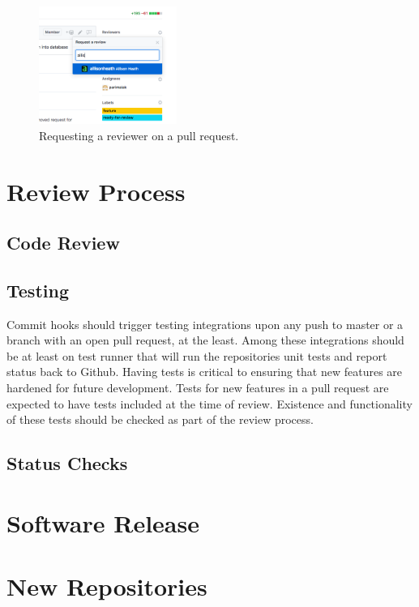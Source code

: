\documentclass[a4paper,12pt,titlepage]{scrartcl}
\begin{document}
   	\begin{figure}
  		\centering
    		\includegraphics[width=0.4\textwidth]{images/requestreviewer.png}
    		\caption{Requesting a reviewer on a pull request.}
    		\label{fig:requestreviewer}
   	\end{figure}
   
	\section{Review Process}
	
	\subsection{Code Review}
	
	\subsection{Testing}
	
	Commit hooks should trigger testing integrations upon any push to master or a branch with an open pull request, at the least.
	Among these integrations should be at least on test runner that will run the repositories unit tests and report status back to Github.
	Having tests is critical to ensuring that new features are hardened for future development.
	Tests for new features in a pull request are expected to have tests included at the time of review.
	Existence and functionality of these tests should be checked as part of the review process.
	
	\subsection{Status Checks}
   
	\section{Software Release}
	
	\section{New Repositories}
	
\end{document}
